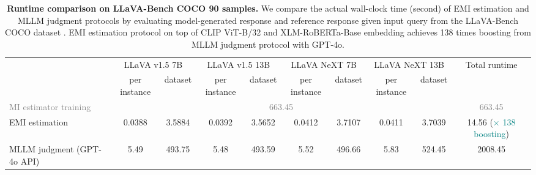 \begin{table}[]
\caption{\textbf{Runtime comparison on LLaVA-Bench COCO 90 samples.} We compare the actual wall-clock time (second) of EMI estimation and MLLM judgment protocols by evaluating model-generated response and reference response given input query from the LLaVA-Bench COCO dataset \cite{liu2023visual}. EMI estimation protocol on top of CLIP ViT-B/32 and XLM-RoBERTa-Base embedding achieves 138 times boosting from MLLM judgment protocol with GPT-4o. }
\centering
\scriptsize
\begin{tabular}{@{}l|cc|cc|cc|cc||c@{}}
\toprule
 & \multicolumn{2}{c}{LLaVA v1.5 7B} & \multicolumn{2}{c}{LLaVA v1.5 13B} & \multicolumn{2}{c}{LLaVA NeXT 7B} & \multicolumn{2}{c}{LLaVA NeXT 13B} & Total runtime              \\ 
 & per instance       & dataset      & per instance       & dataset       & per instance       & dataset      & per instance       & dataset       & \multicolumn{1}{l}{} \\ \midrule
\textcolor{gray}{MI estimator training} & \multicolumn{8}{c||}{\textcolor{gray}{663.45}}                                            & \textcolor{gray}{663.45}  \\ \midrule
EMI estimation      & 0.0388 & 3.5884 & 0.0392 & 3.5652 & 0.0412 & 3.7107 & 0.0411 & 3.7039 & 14.56 (\textcolor{teal}{$\times$ 138 boosting}) \\
MLLM judgment (GPT-4o API) & 5.49   & 493.75 & 5.48   & 493.59 & 5.52   & 496.66 & 5.83   & 524.45 & 2008.45 \\ \bottomrule
\end{tabular} \label{tab:runtime}
\end{table}